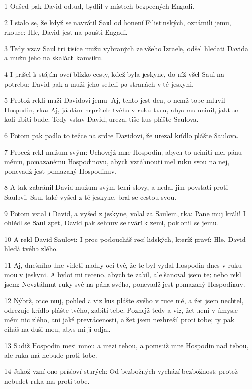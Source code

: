 \par 1 Odšed pak David odtud, bydlil v místech bezpecných Engadi.
\par 2 I stalo se, že když se navrátil Saul od honení Filistinských, oznámili jemu, rkouce: Hle, David jest na poušti Engadi.
\par 3 Tedy vzav Saul tri tisíce mužu vybraných ze všeho Izraele, odšel hledati Davida a mužu jeho na skalách kamsíku.
\par 4 I prišel k stájím ovcí blízko cesty, kdež byla jeskyne, do níž všel Saul na potrebu; David pak a muži jeho sedeli po stranách v té jeskyni.
\par 5 Protož rekli muži Davidovi jemu: Aj, tento jest den, o nemž tobe mluvil Hospodin, rka: Aj, já dám neprítele tvého v ruku tvou, abys mu ucinil, jakt se koli líbiti bude. Tedy vstav David, urezal tiše kus plášte Saulova.
\par 6 Potom pak padlo to težce na srdce Davidovi, že urezal krídlo plášte Saulova.
\par 7 Procež rekl mužum svým: Uchovejž mne Hospodin, abych to uciniti mel pánu mému, pomazanému Hospodinovu, abych vztáhnouti mel ruku svou na nej, ponevadž jest pomazaný Hospodinuv.
\par 8 A tak zabránil David mužum svým temi slovy, a nedal jim povstati proti Saulovi. Saul také vyšed z té jeskyne, bral se cestou svou.
\par 9 Potom vstal i David, a vyšed z jeskyne, volal za Saulem, rka: Pane muj králi! I ohlédl se Saul zpet, David pak sehnuv se tvárí k zemi, poklonil se jemu.
\par 10 A rekl David Saulovi: I proc posloucháš recí lidských, kteríž praví: Hle, David hledá tvého zlého.
\par 11 Aj, dnešního dne videti mohly oci tvé, že te byl vydal Hospodin dnes v ruku mou v jeskyni. A bylot mi receno, abych te zabil, ale šanoval jsem te; nebo rekl jsem: Nevztáhnut ruky své na pána svého, ponevadž jest pomazaný Hospodinuv.
\par 12 Nýbrž, otce muj, pohled a viz kus plášte svého v ruce mé, a žet jsem nechtel, odrezuje krídlo plášte tvého, zabiti tebe. Poznejž tedy a viz, žet není v úmysle mém nic zlého, ani jaké prevrácenosti, a žet jsem nezhrešil proti tobe; ty pak cíháš na duši mou, abys mi ji odjal.
\par 13 Sudiž Hospodin mezi mnou a mezi tebou, a pomstiž mne Hospodin nad tebou, ale ruka má nebude proti tobe.
\par 14 Jakož vzní ono prísloví starých: Od bezbožných vychází bezbožnost; protož nebudet ruka má proti tobe.
